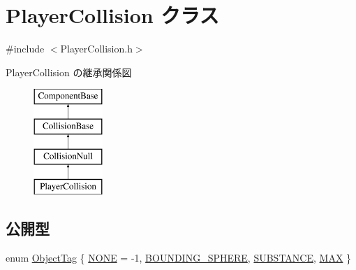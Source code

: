 \hypertarget{class_player_collision}{}\section{Player\+Collision クラス}
\label{class_player_collision}


{\ttfamily \#include $<$Player\+Collision.\+h$>$}

Player\+Collision の継承関係図\begin{figure}[H]
\begin{center}
\leavevmode
\includegraphics[height=4.000000cm]{class_player_collision}
\end{center}
\end{figure}
\subsection*{公開型}
\begin{DoxyCompactItemize}
\item 
enum \mbox{\hyperlink{class_player_collision_a628e8898ff4fc1f85eb4ba44eb0a6907}{Object\+Tag}} \{ \mbox{\hyperlink{class_player_collision_a628e8898ff4fc1f85eb4ba44eb0a6907abde9854e7cb5dd2906a4f5e7ca3a896d}{N\+O\+NE}} = -\/1, 
\mbox{\hyperlink{class_player_collision_a628e8898ff4fc1f85eb4ba44eb0a6907ae8cec799ba827b372f0d4bedec1b9bbb}{B\+O\+U\+N\+D\+I\+N\+G\+\_\+\+S\+P\+H\+E\+RE}}, 
\mbox{\hyperlink{class_player_collision_a628e8898ff4fc1f85eb4ba44eb0a6907a1bdf29253670ff99684ddff916536360}{S\+U\+B\+S\+T\+A\+N\+CE}}, 
\mbox{\hyperlink{class_player_collision_a628e8898ff4fc1f85eb4ba44eb0a6907aa9f8cab198da5574b7a22acc4ecd42d5}{M\+AX}}
 \}
\end{DoxyCompactItemize}
